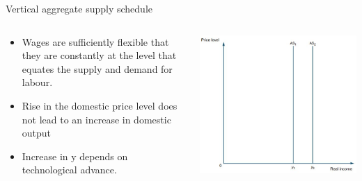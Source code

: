 \documentclass[10pt,hyperref={CJKbookmarks=true},xcolor=dvipsnames,aspectratio=169]{beamer}
\begin{document}
\begin{frame}{Vertical aggregate supply schedule}




\begin{columns}[onlytextwidth]
\begin{column}{0.4\textwidth}
\begin{itemize}
\item Wages are sufficiently flexible that they are constantly at the level
that equates the supply and demand for labour.
\item Rise in the domestic price level does not lead to an increase in domestic
output
\item Increase in y depends on technological advance.
\end{itemize}

\end{column}
\begin{column}{0.6\textwidth}
\includegraphics[width=0.8\columnwidth]{fig/boptheory/lec08-15}
\end{column}
\end{columns}

\end{frame}
\end{document}

